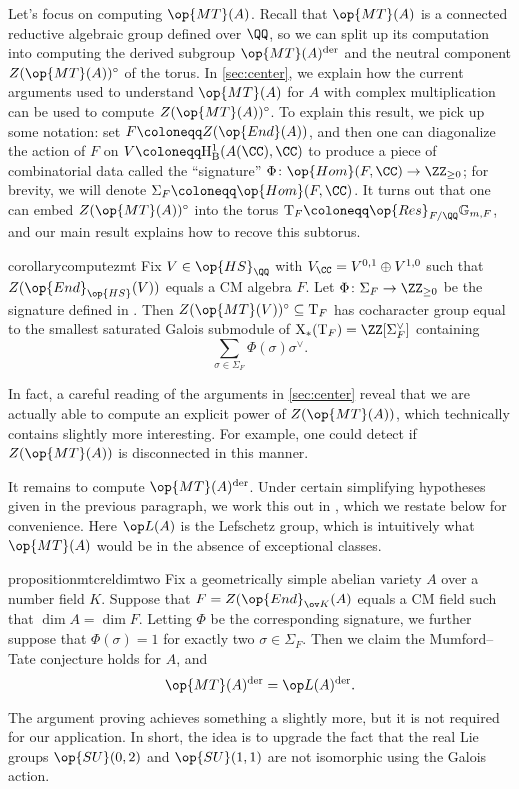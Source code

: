 \documentclass[openany]{book}
\begin{document}
Let's focus on computing $\op{MT}(A)$. Recall that $\op{MT}(A)$ is a connected reductive algebraic group defined over $\QQ$, so we can split up its computation into computing the derived subgroup $\op{MT}(A)^{\mathrm{der}}$ and the neutral component $Z(\op{MT}(A))^\circ$ of the torus. In \cref{sec:center}, we explain how the current arguments used to understand $\op{MT}(A)$ for $A$ with complex multiplication can be used to compute $Z(\op{MT}(A))^\circ$. To explain this result, we pick up some notation: set $F\coloneqq Z(\op{End}(A))$, and then one can diagonalize the action of $F$ on $V\coloneqq\mathrm H^1_{\mathrm B}(A(\CC),\CC)$ to produce a piece of combinatorial data called the ``signature'' $\Phi\colon\op{Hom}(F,\CC)\to\ZZ_{\ge0}$; for brevity, we will denote $\Sigma_F\coloneqq\op{Hom}(F,\CC)$. It turns out that one can embed $Z(\op{MT}(A))^\circ$ into the torus $\mathrm T_F\coloneqq\op{Res}_{F/\QQ}\mathbb G_{m,F}$, and our main result explains how to recove this subtorus.
\begin{restatable*}{corollary}{computezmt} \label{cor:compute-z-mt}
	Fix $V\in\op{HS}_\QQ$ with $V_\CC=V^{0,1}\oplus V^{1,0}$ such that $Z(\op{End}_{\op{HS}}(V))$ equals a CM algebra $F$. Let $\Phi\colon\Sigma_F\to\ZZ_{\ge0}$ be the signature defined in . Then $Z(\op{MT}(V))^\circ\subseteq\mathrm T_F$ has cocharacter group equal to the smallest saturated Galois submodule of $\mathrm X_*(\mathrm T_F)=\ZZ[\Sigma_F^\lor]$ containing
	\[\sum_{\sigma\in\Sigma_F}\Phi(\sigma)\sigma^\lor.\]
\end{restatable*}
\begin{remark}
	In fact, a careful reading of the arguments in \cref{sec:center} reveal that we are actually able to compute an explicit power of $Z(\op{MT}(A))$, which technically contains slightly more interesting. For example, one could detect if $Z(\op{MT}(A))$ is disconnected in this manner.
\end{remark}
It remains to compute $\op{MT}(A)^{\mathrm{der}}$. Under certain simplifying hypotheses given in the previous paragraph, we work this out in , which we restate below for convenience. Here $\op L(A)$ is the Lefschetz group, which is intuitively what $\op{MT}(A)$ would be in the absence of exceptional classes.
\begin{restatable*}{proposition}{mtcreldimtwo} \label{prop:mtc-reldim-2}
	Fix a geometrically simple abelian variety $A$ over a number field $K$. Suppose that $F=Z(\op{End}_{\ov K}(A)$ equals a CM field such that $\dim A=\dim F$. Letting $\Phi$ be the corresponding signature, we further suppose that $\Phi(\sigma)=1$ for exactly two $\sigma\in\Sigma_F$. Then we claim the Mumford--Tate conjecture holds for $A$, and
	\[\op{MT}(A)^{\mathrm{der}}=\op L(A)^{\mathrm{der}}.\]
\end{restatable*}
\noindent The argument proving  achieves something a slightly more, but it is not required for our application. In short, the idea is to upgrade the fact that the real Lie groups $\op{SU}(0,2)$ and $\op{SU}(1,1)$ are not isomorphic using the Galois action.
\end{document}
